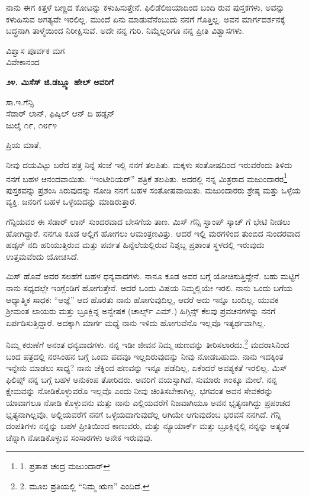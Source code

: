 ನಾನು ಈಗ ಕಿತ್ತಳೆ ಬಣ್ಣದ ಕೋಟನ್ನು ಕಳುಹಿಸುತ್ತೇನೆ. ಫಿಲಿಡೆಲಿಙಯಾದಿಂದ ಬಂದಿ ರುವ ಪುಸ್ತಕಗಳು, ಅವನ್ನು ಕಳುಹಿಸುವ ಅಗತ್ಯವೇ ಇರಲಿಲ್ಲ. ಮುಂದೆ ಏನು ಮಾಡುವೆನೆಂಬುದು ನನಗೆ ಗೊತ್ತಿಲ್ಲ. ಅವನ ಮಾರ್ಗದರ್ಶನಕ್ಕೆ ಬದ್ಧನಾಗಿ ತಾಳ್ಮೆಯಿಂದ ನಿರೀಕ್ಷಿಸುವೆ. ಅದೇ ನನ್ನ ಗುರಿ. ನಿಮ್ಮೆಲ್ಲರಿಗೂ ನನ್ನ ಪ್ರೀತಿ ವಿಶ್ವಾಸಗಳು.

\begin{flushright}
ವಿಶ್ವಾಸ ಪೂರ್ವಕ ಮಗ\\ವಿವೇಕಾನಂದ
\end{flushright}

\begin{center}
\textbf{೨೪. ಮಿಸೆಸ್ ಜಿ.ಡಬ್ಲ್ಯೂ ಹೇಲ್ ಅವರಿಗೆ}
\end{center}

\begin{flushright}
 ಸಾ.ಇ.ಗೆನ್ಸಿ\\ಸೆಡಾರ್ ಲಾನ್, ಫಿಷ್ಕಿಲ್ ಆನ್ ದಿ ಹಡ್ಸನ್\\ಜುಲೈ ೧೯, ೧೮೯೪
\end{flushright}

ಪ್ರಿಯ ಮಾತೆ,

ನೀವು ದಯವಿಟ್ಟು ಬರೆದ ಪತ್ರ ನಿನ್ನೆ ಸಂಜೆ ಇಲ್ಲಿ ನನಗೆ ತಲಪಿತು. ಮಕ್ಕಳು ಸಂತೋಷದಿಂದ ಇರುವರೆಂದು ತಿಳಿದು ನನಗೆ ಬಹಳ ಆನಂದವಾಯಿತು. “ಇಂಟೀರಿಯರ್” ಪತ್ರಿಕೆ ತಲಪಿತು. ಅದರಲ್ಲಿ ನನ್ನ ಮಿತ್ರರಾದ ಮಜುಂದಾರರ\footnote{1. ಪ್ರತಾಪ ಚಂದ್ರ ಮಜುಂದಾರ್} ಪುಸ್ತಕವನ್ನು ಪ್ರಶಂಸಿ ಸಿರುವುದನ್ನು ನೋಡಿ ನನಗೆ ಬಹಳ ಸಂತೋಷವಾಯಿತು. ಮಜುಂದಾರರು ಶ್ರೇಷ್ಠ ಮತ್ತು ಒಳ್ಳೆಯ ವ್ಯಕ್ತಿ. ಜನರಿಗೆ ಬಹಳ ಒಳ್ಳೆಯದನ್ನು ಮಾಡಿರುತ್ತಾರೆ.

ಗೆನ್ಸಿಯವರ ಈ ಸೆಡಾರ್ ಲಾನ್ ಸುಂದರವಾದ ಬೇಸಗೆಯ ತಾಣ. ಮಿಸ್ ಗೆನ್ಸಿ ಸ್ವಾಂಪ್ ಸ್ಕಾಚ್ ಗೆ ಭೇಟಿ ನೀಡಲು ಹೋಗಿದ್ದಾರೆ. ನನಗೂ ಕೂಡ ಅಲ್ಲಿಗೆ ಹೋಗಲು ಆಮಂತ್ರಣವಿತ್ತು. ಆದರೆ ಇಲ್ಲಿ ಮರಗಳಿಂದ ತುಂಬಿದ ಸುಂದರವಾದ ಹಡ್ಸನ್ ನದಿ ಹರಿಯುತ್ತಿರುವ ಮತ್ತು ಪರ್ವತ ಹಿನ್ನೆಲೆಯಲ್ಲಿರುವ ನಿಶ್ಶಬ್ದ ಪ್ರಶಾಂತ ಸ್ಥಳದಲ್ಲಿ ಇರುವುದು ಉತ್ತಮವೆಂದು ಯೋಚಿಸಿದೆ.

ಮಿಸ್ ಹೊವೆ ಅವರ ಸಲಹೆಗೆ ಬಹಳ ಧನ್ಯವಾದಗಳು. ನಾನೂ ಕೂಡ ಅವರ ಬಗ್ಗೆ ಯೋಚಿಸುತ್ತಿದ್ದೇನೆ. ಬಹು ಮಟ್ಟಿಗೆ ನಾನು ಸಧ್ಯದಲ್ಲೇ ಇಂಗ್ಲೆಂಡಿಗೆ ಹೋಗುತ್ತೇನೆ. ಆದರೆ ಒಂದು ವಿಷಯ ನಿಮ್ಮಲ್ಲಿಯೇ ಇರಲಿ. ನಾನು ಒಂದು ಬಗೆಯ ಆಧ್ಯಾತ್ಮಿಕ ಸಾಧಕ: “ಆಜ್ಞೆ” ಆದ ಹೊರತು ನಾನು ಹೋಗುವುದಿಲ್ಲ, ಆದರೆ ಅದು ಇನ್ನೂ ಬಂದಿಲ್ಲ. ಯುವಕ ಶ‍್ರೀಮಂತ ಲಾಯರು ಮತ್ತು ಬ್ರೂಕ್ಲಿನ್ನ ಅನ್ವೇಷಕ (ಚಾರ್ಲ್ಸ್ ಎಮ್​.) ಹಿಗ್ಗಿನ್ಸ್ ಕೆಲವು ಪ್ರವಚನಗಳನ್ನು ನನಗೆ ಏರ್ಪಡಿಸುತ್ತಿದ್ದಾರೆ. ಅದಕ್ಕಾಗಿ ಮಾರ್ಗ ಮಧ್ಯೆ ನಾನು ಇಳಿದು ಹೋಗುವೆನೊ ಇಲ್ಲವೊ ಇತ್ಯರ್ಥವಾಗಿಲ್ಲ.

ನಿಮ್ಮ ಕರುಣೆಗೆ ಅನಂತ ಧನ್ಯವಾದಗಳು. ನನ್ನ ಇಡೀ ಜೀವನ ನಿಮ್ಮ ಋಣವನ್ನು ತೀರಿಸಲಾರದು.\footnote{2. ಮೂಲ ಪ್ರತಿಯಲ್ಲಿ “ನಿಮ್ಮ ಋಣ” ಎಂದಿದೆ.} ಮದರಾಸಿನಿಂದ ಬಂದ ಪತ್ರದಲ್ಲಿ ನರಸಿಂಹನ ಬಗ್ಗೆ ಒಂದು ಪದವೂ ಇಲ್ಲದಿರುವುದನ್ನು ನೀವು ನೋಡಬಹುದು. ನಾನು ಇದಕ್ಕಿಂತ ಇನ್ನೇನು ಮಾಡಲು ಸಾಧ್ಯ? ನಾನು ಚೆಕ್ನಿಂದ ಹಣವನ್ನು ಇನ್ನೂ ಪಡೆದಿಲ್ಲ, ಏಕೆಂದರೆ ಅವಶ್ಯಕತೆ ಇರಲಿಲ್ಲ. ಮಿಸ್ ಫಿಲಿಪ್ಸ್ ನನ್ನ ಬಗ್ಗೆ ಬಹಳ ಅನುಕಂಪ ತೋರಿದರು. ಅವರಿಗೆ ವಯಸ್ಸಾಗಿದೆ, ಸುಮಾರು ೫೦ಕ್ಕೂ ಮೇಲೆ. ನನ್ನ ಕ್ಷೇಮವನ್ನು ನೋಡಿಕೊಳ್ಳುವರೊ ಇಲ್ಲವೊ ಎಂದು ನೀವು ಚಿಂತಿಸಬೇಕಾಗಿಲ್ಲ. ಭಗವಂತ ಅವನ ಸೇವಕರನ್ನು ಯಾವಾಗಲೂ ನೋಡಿ ಕೊಳ್ಳುವನು ಮತ್ತು ನಾನು ಎಲ್ಲಿಯವರೆಗೆ ನಿಜವಾಗಿಯೂ ಅವನ ಭೃತ್ಯನಾಗಿದ್ದು ಪ್ರಪಂಚದ ಭೃತ್ಯನಾಗಿಲ್ಲವೊ, ಅಲ್ಲಿಯವರೆಗೆ ನನಗೆ ಒಳ್ಳೆಯದಾಗುವುದೆಲ್ಲ ಆಗಿಯೇ ಆಗುವುದೆಂಬ ಭರವಸೆ ನನಗಿದೆ. ಗೆನ್ಸಿ ದಂಪತಿಗಳು ನನ್ನನ್ನು ಬಹಳ ಪ್ರೀತಿಯಿಂದ ಕಾಣುವರು, ಮತ್ತು ನ್ಯೂಯಾರ್ಕ್ ಮತ್ತು ಬ್ರೂಕ್ಲಿನ್ನಲ್ಲಿ ನನ್ನನ್ನು ಅತ್ಯಂತ ಚೆನ್ನಾಗಿ ನೋಡಿಕೊಳ್ಳುವ ಸಂಸಾರಗಳು ಅನೇಕ ಇರುವುವು.

